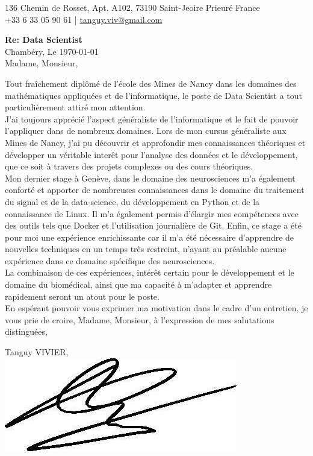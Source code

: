 \documentclass[]{cv-style}
\begin{document}
\huge
{}       %
\vspace{-0.9cm}
\begin{center}
    \large
    136 Chemin de Rosset, Apt. A102, 73190 Saint-Jeoire Prieuré France \\  +33 6 33 05 90 61 | \href{tanguy.viv@gmail.com}{tanguy.viv@gmail.com}
\end{center}
%
\vspace{1.5cm}
\begin{flushleft}
    \large
    \textbf{Re: Data Scientist} \\[0.5cm]
    Chambéry, Le \today \\[0.5cm]
    Madame, Monsieur, \\[0.5cm]
\end{flushleft}
%
\large
Tout fraîchement diplômé de l'école des Mines de Nancy dans les domaines des mathématiques appliquées et de l'informatique, le poste de Data Scientist a tout particulièrement attiré mon attention. \\[0.5cm]
J'ai toujours apprécié l'aspect généraliste de l'informatique et le fait de pouvoir l'appliquer dans de nombreux domaines. Lors de mon cursus généraliste aux Mines de Nancy, j'ai pu découvrir et approfondir mes connaissances théoriques et développer un véritable interêt pour l'analyse des données et le développement, que ce soit à travers des projets complexes ou des cours théoriques. \\[0.5cm]
Mon dernier stage à Genève, dans le domaine des neurosciences m'a également conforté et apporter de nombreuses connaissances dans le domaine du traitement du signal et de la data-science, du développement en Python et de la connaissance de Linux. Il m'a également permis d'élargir mes compétences avec des outils tels que Docker et l'utilisation journalière de Git. Enfin, ce stage a été pour moi une expérience enrichissante car il m'a été nécessaire d'apprendre de nouvelles techniques en un temps très restreint, n'ayant au préalable aucune expérience dans ce domaine spécifique des neurosciences. \\[0.5cm]
La combinaison de ces expériences, intérêt certain pour le développement et le domaine du biomédical, ainsi que ma capacité à m'adapter et apprendre rapidement seront un atout pour le poste. \\[0.5cm]
En espérant pouvoir vous exprimer ma motivation dans le cadre d’un entretien, je vous prie de croire, Madame, Monsieur, à l’expression de mes salutations distinguées, \\[0.5cm]
%
\begin{flushright}
\parbox{5cm}{
\centering
    Tanguy VIVIER,\\
    \hspace{2cm}\includegraphics[scale=0.4]{signature.jpg}
}
\end{flushright}
\end{document}
